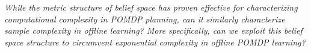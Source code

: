 \documentclass[twoside]{article}
\newcommand{\zyh}[1]{{\color{blue}{ [\textbf{Youheng:}} #1]}}
\newcommand{\yplu}[1]{{\color{orange}{ [\textbf{Yiping:}} #1]}}
\begin{document}
\textit{While the metric structure of belief space has proven effective for characterizing computational complexity in POMDP planning, can it similarly characterize sample complexity in offline learning? More specifically, can we exploit this belief space structure to circumvent exponential complexity in offline POMDP learning?}


\end{document}
